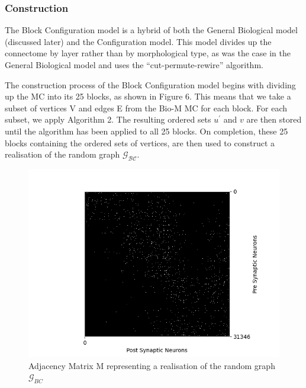 \subsubsection{Construction}
The Block Configuration model is a hybrid of both the General Biological model (discussed later) and the Configuration model. This model divides up the connectome by layer rather than by morphological type, as was the case in the General Biological model and uses the ``cut-permute-rewire'' \cite{WattsStrogatz1998} algorithm. 

The construction process of the Block Configuration model begins with dividing up the MC into its 25 blocks, as shown in Figure 6. This means that we take a subset of vertices V and edges E from the Bio-M MC for each block. For each subset, we apply Algorithm 2. The resulting ordered sets $u^\prime$ and $v$ are then stored until the algorithm has been applied to all 25 blocks. On completion, these 25 blocks containing the ordered sets of vertices, are then used to construct a realisation of the random graph $\mathcal{G_{BC}}$.


\begin{figure}[H]
\begin{center}
\captionsetup{justification=centering}
\includegraphics[width=12cm]{BC/matrix_Block_Configuration.png}
\caption{Adjacency Matrix M representing a realisation of the random graph $\mathcal{G}_{BC}$}
\end{center}
\end{figure}

